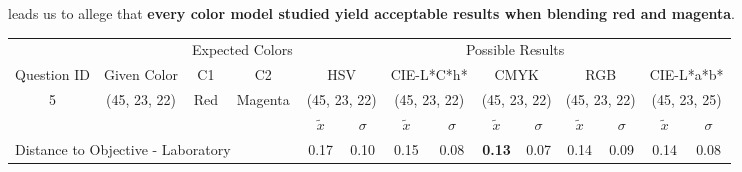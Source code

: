 leads us to allege that \textbf{every color model studied yield acceptable results when blending red and magenta}.
%
\begin{table}[H]
  \resizebox{\textwidth}{!} {
  \begin{tabular}{lccccccccccccc}
    \hline
    \multicolumn{1}{c}{}                              &                                      & \multicolumn{2}{c}{Expected Colors}                   & \multicolumn{10}{c}{Possible Results}                                                                                                                                                                                                                                                                                        \\ \cline{3-14}
    \multicolumn{1}{c}{\multirow{-2}{*}{Question ID}} & \multirow{-2}{*}{Given Color}        & C1                       & C2                         & \multicolumn{2}{c}{HSV}                                        & \multicolumn{2}{c}{CIE-L*C*h*}                                 & \multicolumn{2}{c}{CMYK}                                       & \multicolumn{2}{c}{RGB}                                        & \multicolumn{2}{c}{CIE-L*a*b*}                                 \\ \hline
    \multicolumn{1}{c}{5}                             & \cellcolor[HTML]{FF0080}(45, 23, 22) & \multicolumn{1}{c|}{Red} & \multicolumn{1}{c|}{Magenta}  & \multicolumn{2}{c|}{\cellcolor[HTML]{FF0080}(45, 23, 22)}      & \multicolumn{2}{c|}{\cellcolor[HTML]{FF0080}(45, 23, 22)}       & \multicolumn{2}{c|}{\cellcolor[HTML]{FF0080}(45, 23, 22)}       & \multicolumn{2}{c|}{\cellcolor[HTML]{FF0080}(45, 23, 22)}       & \multicolumn{2}{c|}{\cellcolor[HTML]{FF0087}(45, 23, 25)}       \\ \hline
                                                      & \multicolumn{1}{l}{}                 & \multicolumn{1}{l}{}     & \multicolumn{1}{l}{}       & \multicolumn{1}{c}{$\tilde{x}$} & \multicolumn{1}{c}{$\sigma$} & \multicolumn{1}{c}{$\tilde{x}$} & \multicolumn{1}{c}{$\sigma$} & \multicolumn{1}{c}{$\tilde{x}$} & \multicolumn{1}{c}{$\sigma$} & \multicolumn{1}{c}{$\tilde{x}$} & \multicolumn{1}{c}{$\sigma$} & \multicolumn{1}{c}{$\tilde{x}$} & \multicolumn{1}{c}{$\sigma$} \\ \hline
    \multicolumn{4}{l}{Distance to Objective - Laboratory}                                                                                           & \multicolumn{1}{|c}{0.17}       & \multicolumn{1}{c|}{0.10}    & \multicolumn{1}{|c}{0.15}       & \multicolumn{1}{c|}{0.08}    & \multicolumn{1}{|c}{\textbf{0.13}}       & \multicolumn{1}{c|}{0.07}    & \multicolumn{1}{|c}{0.14}       & \multicolumn{1}{c|}{0.09}    & \multicolumn{1}{|c}{0.14}       & \multicolumn{1}{c|}{0.08}    \\

\end{tabular}}
\end{table}
